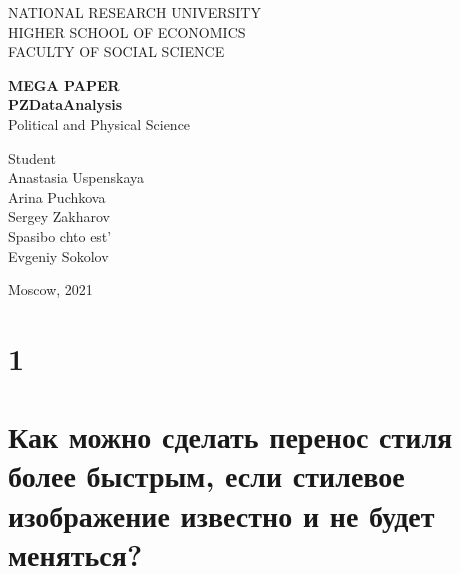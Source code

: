\documentclass[14pt]{extarticle}
\begin{document}
	
	
	\thispagestyle{empty} 
	
	\begin{center}
		NATIONAL RESEARCH UNIVERSITY
		\\
		HIGHER SCHOOL OF ECONOMICS
		\\
		FACULTY OF SOCIAL SCIENCE
		
	\end{center}
	\vspace{12ex}
	
	\begin{center}
		\textbf{MEGA PAPER}\\
		\vspace{2ex}
		\textbf{PZDataAnalysis}\\
		\vspace{2ex}
		Political and Physical Science
	\end{center}
	
	\vspace{5ex}
	\begin{flushright}
		\hspace{40ex}
		Student\\
		Anastasia Uspenskaya \\
		Arina Puchkova \\
		Sergey Zakharov\\
		
		\vspace{5ex}
		Spasibo chto est'\\
		Evgeniy Sokolov \\
		
		
		
	\end{flushright}
	
	\begin{center}
		\vfill
		Moscow, 2021
	\end{center}
	
	\newpage
	
	
	\tableofcontents
	
	\newpage
	
	
	\section{1} %
	
	
	\newpage
	\section{Как можно сделать перенос стиля более быстрым, если стилевое изображение известно и не будет меняться?} %
	
	
\end{document}
